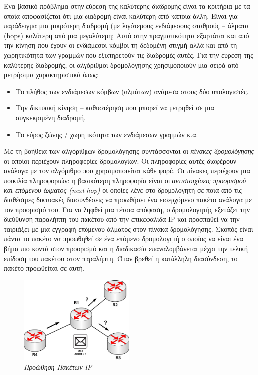 Ένα βασικό πρόβλημα στην εύρεση της καλύτερης διαδρομής είναι τα κριτήρια με τα οποία αποφασίζεται ότι μια διαδρομή είναι καλύτερη από κάποια άλλη.  Είναι για παράδειγμα μια μικρότερη διαδρομή (με λιγότερους ενδιάμεσους σταθμούς -- άλματα (hops) καλύτερη από μια μεγαλύτερη; Αυτό στην πραγματικότητα εξαρτάται και από την κίνηση που έχουν οι ενδιάμεσοι κόμβοι τη δεδομένη στιγμή αλλά και από τη χωρητικότητα των γραμμών που εξυπηρετούν τις διαδρομές αυτές. Για την εύρεση της καλύτερης διαδρομής, οι αλγόριθμοι δρομολόγησης χρησιμοποιούν μια σειρά από μετρήσιμα χαρακτηριστικά όπως:

\begin{itemize}
\item Το πλήθος των ενδιάμεσων κόμβων (αλμάτων) ανάμεσα στους δύο υπολογιστές.
\item Την δικτυακή κίνηση -- καθυστέρηση που μπορεί να μετρηθεί σε μια συγκεκριμένη διαδρομή.
\item Το εύρος ζώνης / χωρητικότητα των ενδιάμεσων γραμμών κ.α.
\end{itemize}

Με τη βοήθεια των αλγόριθμων δρομολόγησης συντάσσονται οι \emph{πίνακες δρομολόγησης} οι οποίοι περιέχουν πληροφορίες δρομολογίων. Οι πληροφορίες αυτές διαφέρουν ανάλογα με τον αλγόριθμο που χρησιμοποιείται κάθε φορά.  Οι πίνακες περιέχουν μια ποικιλία πληροφοριών: η βασικότερη πληροφορία είναι οι \emph{αντιστοιχίσεις προορισμού και επόμενου άλματος (next hop)} οι οποίες λένε στο δρομολογητή σε ποια από τις διαθέσιμες δικτυακές διασυνδέσεις να προωθήσει ένα εισερχόμενο πακέτο ανάλογα με τον προορισμό του. Για να ληφθεί μια τέτοια απόφαση, ο δρομολογητής εξετάζει την διεύθυνση παραλήπτη του πακέτου από την επικεφαλίδα IP και προσπαθεί να την ταιριάξει με μια εγγραφή επόμενου άλματος στον πίνακα δρομολόγησης. Σκοπός είναι πάντα το πακέτο να προωθηθεί σε ένα επόμενο δρομολογητή ο οποίος να είναι ένα βήμα πιο κοντά στον προορισμό και η διαδικασία επαναλαμβάνεται μέχρι την τελική επίδοση του πακέτου στον παραλήπτη. Όταν βρεθεί η κατάλληλη διασύνδεση, το πακέτο προωθείται σε αυτή.

\begin{figure}[!ht]
 \centering
 \includegraphics[width=0.50\textwidth]{images/chapter3/3-19}
 \caption {\textsl{Προώθηση Πακέτων IP}}
 \label{3-19}
\end{figure}

